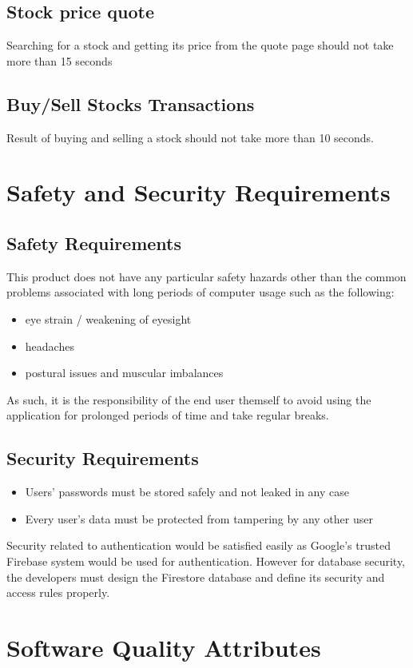 \documentclass[12 pt, a4paper]{report}
\begin{document}
	\subsection{Stock price quote}
	Searching for a stock and getting its price from the quote page should not take more than 15 seconds
	\subsection{Buy/Sell Stocks Transactions}
	Result of buying and selling a stock should not take more than 10 seconds.
	
	
	\section {Safety and Security Requirements}
	\subsection{Safety Requirements}
	This product does not have any particular safety hazards other than the common problems associated with long periods of computer usage such as the following:
	\begin{itemize}
		\item eye strain / weakening of eyesight
		\item headaches
		\item postural issues and muscular imbalances
	\end{itemize}
	As such, it is the responsibility of the end user themself to avoid using the application for prolonged periods of time and take regular breaks.
	
	\subsection{Security Requirements}
	\begin{itemize}
		\item Users' passwords must be stored safely and not leaked in any case
		\item Every user's data must be protected from tampering by any other user
	\end{itemize}
	Security related to authentication would be satisfied easily as Google's trusted Firebase system would be used for authentication. However for database security, the developers must design the Firestore database and define its security and access rules properly.
		
	\section {Software Quality Attributes}
\end{document}
